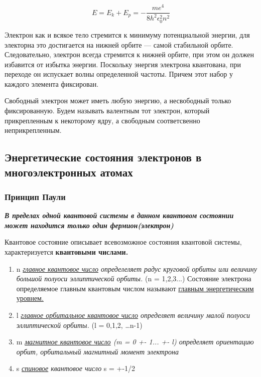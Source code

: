 \documentclass[../main.tex]{subfiles}
\begin{document}
\[E = E_k + E_p = - \frac{me^4}{8 h^2 \epsilon_0 ^2 n^2}\]

Электрон как и всякое тело стремится к минимуму потенциальной энергии, для электорна это достигается на нижней орбите --- самой стабильной орбите. 
Следовательно, электрон всегда стремится к нижней орбите, при этом он должен избавится от избытка энергии. 
Поскольку энергия электрона квантована, при переходе он испускает волны определенной частоты.
Причем этот набор у каждого элемента фиксирован. 

Свободный электрон может иметь любую энергию, а несвободный только фиксированную.
Будем называть валентным тот электрон, который прикрепленным к некоторому ядру, а свободным соответсвенно неприкрепленным.

\subsection{Энергетические состояния электронов в многоэлектронных атомах}

\subsubsection{Принцип Паули}
\begin{center}
    \textbf{\textit{В пределах одной квантовой системы в данном квантовом состоянии может находится только один фермион(электрон)}}
\end{center}
Квантовое состояние описывает всевозможное состояния квантовой системы, характеризуется \textbf{квантовыми числами.}
\begin {enumerate}
    \item n \textit{\underline{главное квантовое число} определеляет радус круговой орбиты или величину большой полуоси эллиптической орбиты.} (n = 1,2,3...)
Состояние электрона определяемое главным квантовым числом называют \underline{главным энергетическим уровнем.}

    \item l \textit{\underline{главное орбитальное квантовое число} определяет величину малой полуоси эллиптической орбиты.} (l = 0,1,2, \ldots n-1) 

    \item m \textit{\underline{магнитное квантовое число} (m = 0 +- 1... +- l) определяет ориентацию орбит, орбитальный магнитный момент электрона}

    \item s \textit{\underline{спиновое} квантовое число} s = +-1/2
\end{enumerate}
\end{document}
